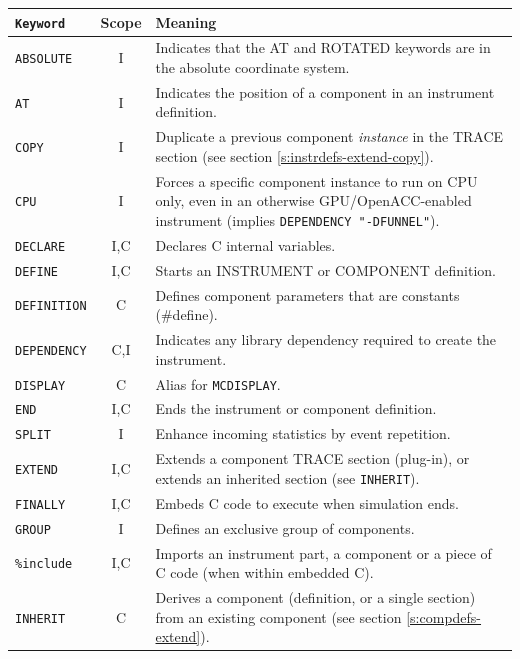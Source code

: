 \begin{table}
  \begin{center}
    {\let\my=\\
    \begin{tabular}{|l|c|p{}|}
      \hline
      \texttt{Keyword} & Scope & Meaning \\
      \hline
      \texttt{ABSOLUTE} & I & Indicates that the AT and ROTATED keywords are in the absolute coordinate system. \\
      \texttt{AT} & I & Indicates the position of a component in an instrument definition. \\
      \texttt{COPY}& I & Duplicate a previous component \emph{instance} in the TRACE section (see section \ref{s:instrdefs-extend-copy}). \\
      \texttt{CPU} & I & Forces a specific component instance to run on CPU only, even in an otherwise GPU/OpenACC-enabled instrument (implies \texttt{DEPENDENCY "-DFUNNEL"}). \\
      \texttt{DECLARE} & I,C & Declares C internal variables. \\
      \texttt{DEFINE} & I,C & Starts an INSTRUMENT or COMPONENT definition. \\
      \texttt{DEFINITION} & C & Defines component parameters that are constants (\#define). \\
      \texttt{DEPENDENCY} & C,I & Indicates any library dependency required to create the instrument. \\
      \texttt{DISPLAY} & C & Alias for \texttt{MCDISPLAY}. \\
      \texttt{END} & I,C & Ends the instrument or component definition. \\
      \texttt{SPLIT} & I & Enhance incoming statistics by event repetition. \\
      \texttt{EXTEND} & I,C & Extends a component TRACE section (plug-in), or extends an inherited section (see \texttt{INHERIT}). \\
      \texttt{FINALLY} & I,C & Embeds C code to execute when simulation ends. \\
      \texttt{GROUP} & I & Defines an exclusive group of components. \\
      \texttt{\%include} & I,C & Imports an instrument part, a component or a piece of C code (when within embedded C). \\
      \texttt{INHERIT} & C & Derives a component (definition, or a single section) from an existing component (see section \ref{s:compdefs-extend}). \\

\end{tabular}}
\end{center}
\end{table}
